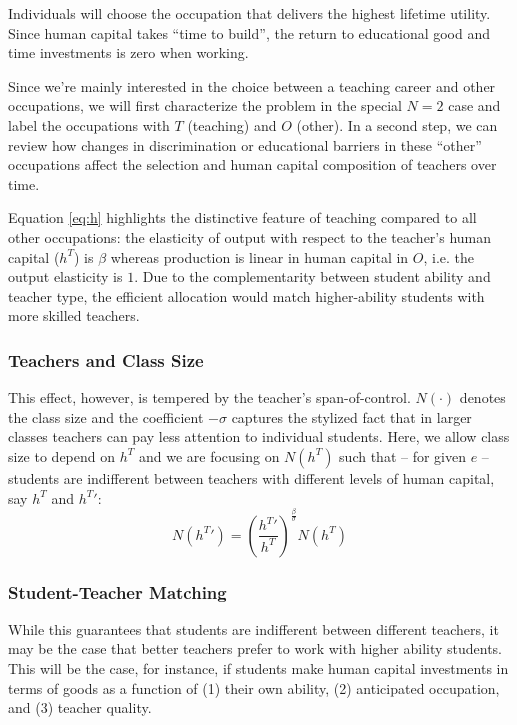 \documentclass[onehalfspacing,11pt]{article}
\begin{document}
Individuals will choose the occupation that delivers the highest lifetime utility. Since human capital takes ``time to build'', the return to educational good and time investments is zero when working.%

Since we're mainly interested in the choice between a teaching career and other occupations, we will first characterize the problem in the special $N=2$ case and label the occupations with $T$ (teaching) and $O$ (other). In a second step, we can review how changes in discrimination or educational barriers in these ``other'' occupations affect the selection and human capital composition of teachers over time.

Equation \eqref{eq:h} highlights the distinctive feature of teaching compared to all other occupations: the elasticity of output with respect to the teacher's human capital ($h^T$) is $\beta$ whereas production is linear in human capital in $O$, i.e. the output elasticity is $1$. Due to the complementarity between student ability and teacher type, the efficient allocation would match higher-ability students with more skilled teachers.
\subsubsection{Teachers and Class Size}
 This effect, however, is tempered by the teacher's span-of-control. $N(\cdot)$ denotes the class size and the coefficient $-\sigma$ captures the stylized fact that in larger classes teachers can pay less attention to individual students. Here, we allow class size to depend on $h^T$ and we are focusing on $N(h^T)$ such that -- for given $e$ -- students are indifferent between teachers with different levels of human capital, say $h^T$ and ${h^T}'$:
 \begin{equation}
\label{ }
N({h^T}') = \left(\frac{{h^T}'}{{h^T}}\right)^{\frac{\beta}{\sigma}} N({h^T})
\end{equation}
\subsubsection{Student-Teacher Matching}
While this guarantees that students are indifferent between different teachers, it may be the case that better teachers prefer to work with higher ability students. This will be the case, for instance, if students make human capital investments in terms of goods as a function of (1) their own ability, (2) anticipated occupation, and (3) teacher quality. 
\end{document}
